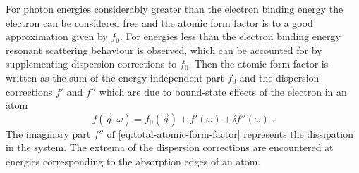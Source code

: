 \documentclass[
twoside,
openright,
titlepage,
numbers=noenddot,
headinclude,
fleqn,
a4paper,
footinclude=true,
cleardoublepage=empty,
abstractoff,
BCOR=5mm,
paper=a4,
fontsize=11pt,
british,ngerman,american,
]{scrreprt}
\begin{document}
For photon energies considerably greater than the electron binding
energy the electron can be considered free and the atomic form factor
is to a good approximation given by $f_0$.  For energies less than the
electron binding energy resonant scattering behaviour is observed,
which can be accounted for by supplementing dispersion corrections to
$f_0$.  Then the atomic form factor is written as the sum of the
energy-independent part $f_0$ and the dispersion corrections $f'$ and
$f''$ which are due to bound-state effects of the electron in an
atom
\begin{equation}
  \label{eq:total-atomic-form-factor}
  f(\vec{q},\omega) = f_0(\vec{q})+ f'(\omega) +\ii f''(\omega) \;.
\end{equation}
The imaginary part $f''$ of \cref{eq:total-atomic-form-factor}
represents the dissipation in the system.  The extrema of the
dispersion corrections are encountered at energies corresponding to
the absorption edges of an atom.
\end{document}
